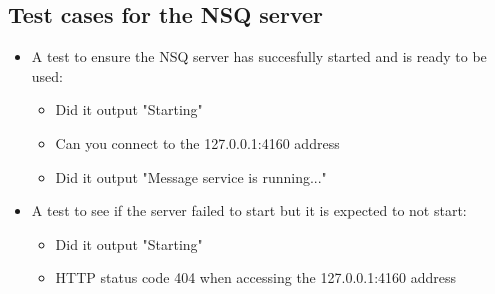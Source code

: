 \documentclass[11pt]{article}
\begin{document}
	\subsection{Test cases for the NSQ server}	
		\begin{itemize}
			\item A test to ensure the NSQ server has succesfully started and is ready to be used:
				\begin{itemize}
					\item Did it output "Starting"
					\item Can you connect to the 127.0.0.1:4160 address
					\item Did it output "Message service is running..."
				\end{itemize}
			\item A test to see if the server failed to start but it is expected to not start:
				\begin{itemize}
					\item Did it output "Starting"
					\item HTTP status code 404 when accessing the 127.0.0.1:4160 address
				\end{itemize}
			\end{itemize}
\end{document}
